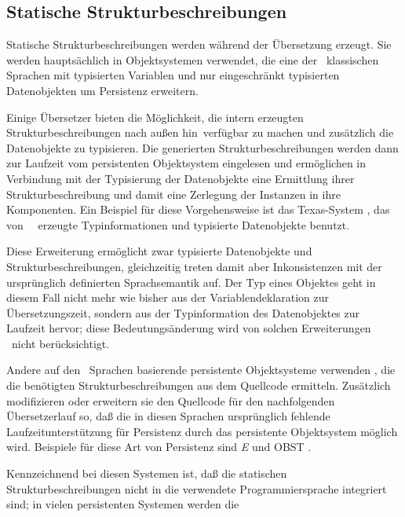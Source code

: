 \subsection{Statische Strukturbeschreibungen}%
%
Statische Strukturbeschreibungen werden w\"{a}hrend der \"{U}bersetzung
erzeugt. Sie werden haupt\-s\"{a}ch\-lich in Objektsystemen verwendet,
die eine der \og[en]\ klassischen Sprachen mit typisierten Variablen
und nur eingeschr\"{a}nkt typisierten Datenobjekten um Persistenz
erweitern.
%
\par{}Einige \"{U}bersetzer bieten die M\"{o}glichkeit, die intern erzeugten
Strukturbeschreibungen \rglq{}nach au\ss{}en hin\rgrq\ verf\"{u}gbar zu machen
und zus\"{a}tzlich die Datenobjekte zu typisieren.  Die generierten
Strukturbeschreibungen werden dann zur Laufzeit vom persistenten
Objektsystem eingelesen und erm\"{o}glichen in Verbindung mit der
Typisierung der Datenobjekte eine Ermittlung ihrer
Strukturbeschreibung und damit eine Zerlegung der Instanzen in ihre
Komponenten. Ein Beispiel f\"{u}r diese Vorgehensweise ist das
Texas-System \cite[]{bib:skw93}, das von
\gnu\ \cpp\ erzeugte Typinformationen und typisierte Datenobjekte
benutzt.
%
\par{}Diese Erweiterung erm\"{o}glicht zwar typisierte Datenobjekte und
Strukturbeschreibungen, gleich\-zei\-tig treten damit aber
Inkonsistenzen mit der urspr\"{u}nglich definierten Sprachsemantik
auf. Der Typ eines Objektes geht in diesem Fall nicht mehr wie bisher
aus der Variablendeklaration zur \"{U}bersetzungszeit, sondern aus der
Typinformation des Datenobjektes zur Laufzeit hervor; diese
Bedeutungs\"{a}nderung wird von solchen Erweiterungen \ia\ nicht
ber\"{u}cksichtigt.
%
\par{}Andere auf den \og[en]\ Sprachen basierende persistente
Objektsysteme verwenden
, die die
ben\"{o}tigten Strukturbeschreibungen aus dem Quellcode ermitteln.
Zus\"{a}tzlich modifizieren oder erweitern sie den Quellcode f\"{u}r
den nachfolgenden \"{U}bersetzerlauf so, da\ss{} die in diesen
Sprachen urspr\"{u}nglich fehlende Laufzeitunterst\"{u}tzung f\"{u}r
Persistenz durch das persistente Objektsystem m\"{o}glich wird.
Beispiele f\"{u}r diese Art von Persistenz sind {\em E\/}
\cite[]{bib:ri89} und OBST \cite{bib:uhl93}.
%
\par{}Kennzeichnend bei diesen Systemen ist, da\ss{} die statischen
Strukturbeschreibungen nicht in die verwendete Programmiersprache
integriert sind; in vielen persistenten Systemen werden die
